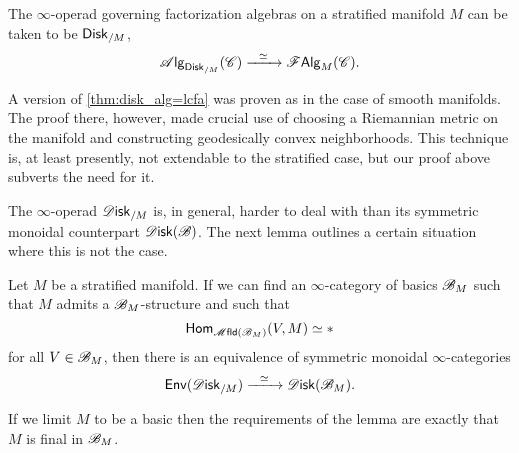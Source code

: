 \documentclass[../text]{subfiles}
\begin{document}
\begin{corollary}\label{cor:disk_alg=falg}
    The $\infty$-operad governing factorization algebras on a stratified manifold $M$ can be taken to be $\disk[r]_{/M}$,
    \begin{equation}
        \alg{\disk[r]_{/M}} (\catC) \xrightarrow{\ \ \simeq \ \ } \falg_M (\catC).
    \end{equation}
\end{corollary}

\begin{remark}
    A version of \cref{thm:disk_alg=lcfa} was proven as \cite[thm.6]{gtz2014} in the case of smooth manifolds. The proof there, however, made crucial use of choosing a Riemannian metric on the manifold and constructing geodesically convex neighborhoods. This technique is, at least presently, not extendable to the stratified case, but our proof above subverts the need for it. 
\end{remark}

The $\infty$-operad $\disk_{/M}$ is, in general, harder to deal with than its symmetric monoidal counterpart $\disk(\bstr)$. The next lemma outlines a certain situation where this is not the case.

\begin{lemma}\label{lem:disk/M_to_disk}
    Let $M$ be a stratified manifold. If we can find an $\infty$-category of basics $\mathscr{B}_M$ such that $M$ admits a $\mathscr{B}_M$-structure and such that
    \begin{equation}
        \mathsf{Hom}_{\mfld(\bstr_M)} (V, M) \simeq *
    \end{equation}
    for all $V \in \mathscr{B}_M$, then there is an equivalence of symmetric monoidal $\infty$-categories
    \begin{equation}
        \mathsf{Env}(\disk_{/M}) \xrightarrow{\ \ \simeq \ \ } \disk(\bstr_M).
    \end{equation}
\end{lemma}

\begin{remark}
    If we limit $M$ to be a basic then the requirements of the lemma are exactly that $M$ is final in $\mathscr{B}_M$.
\end{remark}
\end{document}
